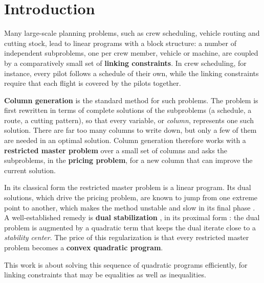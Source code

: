 \chapter{Introduction}
\label{chap:introduction}

\vspace*{\fill}

Many large-scale planning problems, such as crew scheduling, vehicle routing and cutting stock,
lead to linear programs with a block structure: a number of independent subproblems, one per
crew member, vehicle or machine, are coupled by a comparatively small set of
\textbf{linking constraints}. In crew scheduling, for instance, every pilot follows a
schedule of their own, while the linking constraints require that each flight is covered by
the pilots together.

\medskip

\textbf{Column generation} is the standard method for such problems. The problem is first
rewritten in terms of complete solutions of the subproblems (a schedule, a route, a cutting
pattern), so that every variable, or \emph{column}, represents one such solution. There are
far too many columns to write down, but only a few of them are needed in an optimal
solution. Column generation therefore works with a \textbf{restricted master problem} over a
small set of columns and asks the subproblems, in the \textbf{pricing problem}, for a new
column that can improve the current solution.

\medskip

In its classical form the restricted master problem is a linear program. Its dual solutions,
which drive the pricing problem, are known to jump from one extreme point to another, which
makes the method unstable and slow in its final phase \cite{lubbecke2005selected}. A
well-established remedy is \textbf{dual stabilization}
\cite{dumerle1999stabilized, briant2008comparison}, in its proximal form
\cite{briant2008comparison, kiwiel1990proximity}: the dual problem is augmented by a
quadratic term that keeps the dual iterate close to a \emph{stability center}. The price of this regularization is
that every restricted master problem becomes a \textbf{convex quadratic program}.

\medskip

This work is about solving this sequence of quadratic programs efficiently, for linking
constraints that may be equalities as well as inequalities.

\vspace*{\fill}

